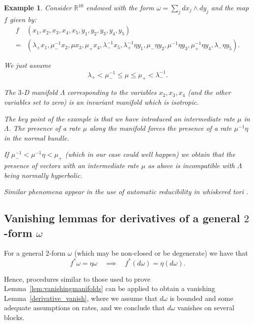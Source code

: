\documentclass[11pt]{amsart}
\newtheorem{ex}[thm]{Example}
\theoremstyle{definition}
\theoremstyle{remark}
\numberwithin{equation}{section}
\newcommand{\R}{\mathbb R}
\begin{document}
  \begin{ex}
    Consider $\R^{10}$ endowed with the form
    $\omega = \sum_j d x_j \wedge d y_j$
and the map $f$ given by:
\[
\begin{split}
    f &(
    x_1,
    x_2,
    x_3,
    x_4,
    x_5,
    y_1,
    y_2,
    y_3,
    y_4,
    y_5)
    \\ = &
    \left( \lambda_+ x_1,
      \mu_-^{-1} x_2,
      \mu x_3,
      \mu_+ x_4,
      \lambda_-^{-1} x_5, \lambda_+^{-1} \eta y_1,
                    \mu_- \eta y_2,
                    \mu^{-1} \eta y_3,
                    \mu_+^{-1} \eta y_4,
                    \lambda_- \eta y_5 \right).
          \end{split}
\]


We just assume
\[
   \lambda_+ < \mu_-^{-1} \le  \mu  \le \mu_+ <
   \lambda_-^{-1} .
   \]


The $3$-D manifold $\Lambda$  corresponding to the variables $x_2,x_3,x_4$ (and the other variables set to
zero) is an invariant manifold which is isotropic.

The key point of the example is that we have introduced an intermediate rate $\mu$ in $\Lambda$.
The presence of a rate $\mu$ along the manifold forces
the presence of a rate $\mu^{-1}\eta$ in the normal bundle.

If $\mu_-^{-1} < \mu^{-1} \eta< \mu_+$ (which in our case could well happen)
we obtain that the presence of vectors with an intermediate rate $\mu$ as above is incompatible
with $\Lambda$ being normally hyperbolic.


Similar phenomena appear in the use of automatic reducibility in whiskered tori
\cite{CallejaCL20}.

\end{ex}




\subsection{Vanishing lemmas for derivatives of a general $2$-form $\omega$
}


For a general $2$-form $\omega$ (which may be non-closed or
be degenerate)  we have that
\[
f^*\omega = \eta \omega \quad \implies \quad
f^* (d\omega)  = \eta (d \omega).
\]

Hence, procedures similar to those  used
to prove  Lemma~\ref{lem:vanishingmanifolds}
can be applied to obtain a  vanishing Lemma~\ref{derivative_vanish}, where we assume that  $d\omega$ is bounded and  some adequate assumptions on rates, and we conclude that   $d\omega$ vanishes on several blocks.
\end{document}
